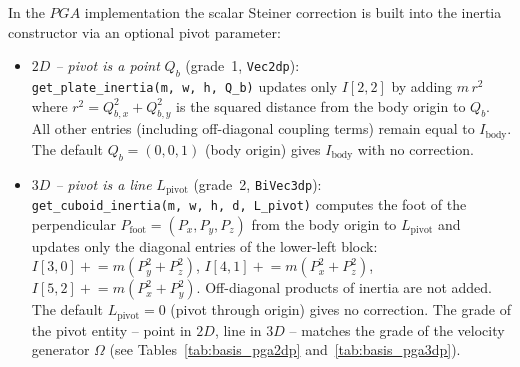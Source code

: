 In the $PGA$ implementation the scalar Steiner correction is built into the inertia
constructor via an optional pivot parameter:
\begin{itemize}
    \item \emph{$2D$ -- pivot is a point} $Q_b$ (grade~1, \texttt{Vec2dp}): \\
    \texttt{get\_plate\_inertia(m, w, h, Q\_b)} updates only $I[2,2]$ by adding
    $m\,r^2$ where $r^2 = Q_{b,x}^2 + Q_{b,y}^2$ is the squared distance from the
    body origin to $Q_b$. All other entries (including off-diagonal coupling terms)
    remain equal to $I_\text{body}$. The default $Q_b = (0,0,1)$ (body origin) gives
    $I_\text{body}$ with no correction.
    \item \emph{$3D$ -- pivot is a line} $L_\text{pivot}$ (grade~2, \texttt{BiVec3dp}): \\
    \texttt{get\_cuboid\_inertia(m, w, h, d, L\_pivot)} computes the foot of the
    perpendicular $P_\text{foot} = (P_x, P_y, P_z)$ from the body origin to
    $L_\text{pivot}$ and updates only the diagonal entries of the lower-left block:
    $I[3,0] \mathrel{+}= m(P_y^2+P_z^2)$, $I[4,1] \mathrel{+}= m(P_x^2+P_z^2)$,
    $I[5,2] \mathrel{+}= m(P_x^2+P_y^2)$. Off-diagonal products of inertia are not
    added. The default $L_\text{pivot} = 0$ (pivot through origin) gives no correction.
    The grade of the pivot entity -- point in $2D$, line in $3D$ -- matches the grade of
    the velocity generator $\Omega$ (see Tables~\ref{tab:basis_pga2dp}
    and~\ref{tab:basis_pga3dp}).
\end{itemize}

